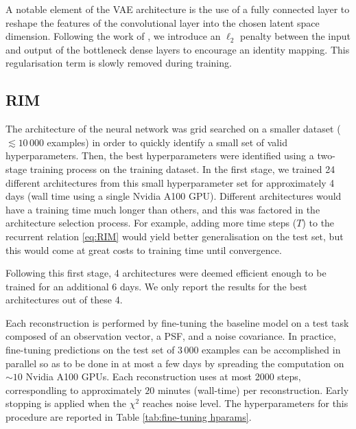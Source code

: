 A notable element of the VAE architecture is the use of a fully connected
layer to reshape the features of the convolutional layer into the chosen 
latent space dimension. Following the work of \citet{Lanusse2021}, we introduce 
an $\ell_{2}$ penalty between the input and output of the bottleneck 
dense layers to encourage an identity mapping. This regularisation 
term is slowly removed during training.


\subsection{RIM}\label{sec:rimtraining}

The architecture of the neural network was grid searched on 
a smaller dataset ($\lesssim 10\,000$ examples) 
in order to quickly identify a small set
of valid hyperparameters. Then, the best hyperparameters were 
identified using a two-stage training process on the training dataset. 
In the first stage, we trained 24 different architectures from this small hyperparameter set for approximately 4 days (wall time using a single Nvidia A100 GPU). 
Different architectures would have a training time much longer than others, and this 
was factored in the architecture selection process. For example, adding more time steps ($T$) to the recurrent relation \eqref{eq:RIM} 
would yield better generalisation on the test set, but this 
would come at great costs to training time until convergence. 

Following this first stage, 4 architectures were deemed efficient enough 
to be trained for an additional 6 days. 
We only report the results for the best architectures out of these 4.

Each reconstruction is performed by fine-tuning the baseline model 
on a test task composed of an observation vector, a PSF, and a noise covariance.
In practice, fine-tuning predictions on the test set of $3\,000$ examples can be accomplished in parallel so as to be done in at most a few days by spreading the computation on $\sim 10$ Nvidia A100 GPUs. Each reconstruction uses at most 2000 steps, correspondling to approximately $20$ minutes (wall-time) per reconstruction. Early stopping is applied when the $\chi^2$ reaches noise level. The hyperparameters for this procedure are reported in Table \ref{tab:fine-tuning hparams}.


